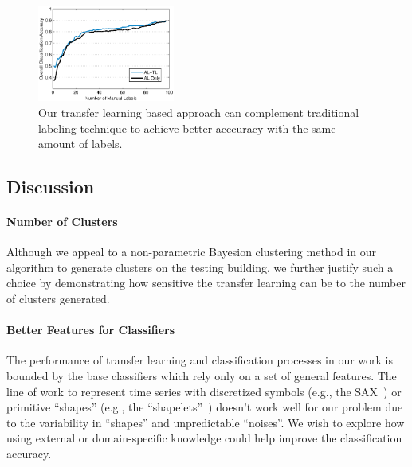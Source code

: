 \begin{figure}[t]
\centering
\includegraphics[width=0.4\textwidth]{./fig/tl_al.eps}
\caption{Our transfer learning based approach can complement traditional labeling technique to achieve better acccuracy with the same amount of labels.}
\label{fig:comp}
\end{figure}


\subsection{Discussion}
\paragraph{Number of Clusters}
Although we appeal to a non-parametric Bayesion clustering method in our algorithm to generate clusters on the testing building, we further justify such a choice by demonstrating how sensitive the transfer learning can be to the number of clusters generated.

\paragraph{Better Features for Classifiers} The performance of transfer learning and classification processes in our work is bounded by the base classifiers which rely only on a set of general features. The line of work to represent time series with discretized symbols (e.g., the SAX~\cite{sax}) or primitive ``shapes'' (e.g., the ``shapelets''~\cite{shapelet1, shapelet2}) doesn't work well for our problem due to the variability in ``shapes'' and unpredictable ``noises''. We wish to explore how using external or domain-specific knowledge could help improve the classification accuracy. 

